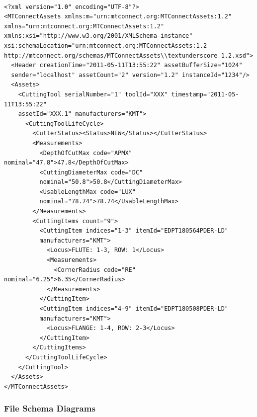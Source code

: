 	\begin{lstlisting}[firstnumber=1,escapechar=|,% 
	caption={Example for Shell Mill with Different Inserts on First Row}, label={lst:Example for Shell Mill with Different Inserts on First Row}]
	
<?xml version="1.0" encoding="UTF-8"?>
<MTConnectAssets xmlns:m="urn:mtconnect.org:MTConnectAssets:1.2" 
xmlns="urn:mtconnect.org:MTConnectAssets:1.2" 
xmlns:xsi="http://www.w3.org/2001/XMLSchema-instance" 
xsi:schemaLocation="urn:mtconnect.org:MTConnectAssets:1.2 
http://mtconnect.org/schemas/MTConnectAssets\\textunderscore 1.2.xsd">
  <Header creationTime="2011-05-11T13:55:22" assetBufferSize="1024" 
  sender="localhost" assetCount="2" version="1.2" instanceId="1234"/>
  <Assets>
    <CuttingTool serialNumber="1" toolId="XXX" timestamp="2011-05-11T13:55:22" 
    assetId="XXX.1" manufacturers="KMT">
      <CuttingToolLifeCycle>
        <CutterStatus><Status>NEW</Status></CutterStatus>
        <Measurements>
          <DepthOfCutMax code="APMX" nominal="47.8">47.8</DepthOfCutMax>
          <CuttingDiameterMax code="DC" 
          nominal="50.8">50.8</CuttingDiameterMax>
          <UsableLengthMax code="LUX" 
          nominal="78.74">78.74</UsableLengthMax>
        </Measurements>
        <CuttingItems count="9">
          <CuttingItem indices="1-3" itemId="EDPT180564PDER-LD" 
          manufacturers="KMT">
            <Locus>FLUTE: 1-3, ROW: 1</Locus>
            <Measurements>
              <CornerRadius code="RE" nominal="6.25">6.35</CornerRadius>
            </Measurements>
          </CuttingItem>
          <CuttingItem indices="4-9" itemId="EDPT180508PDER-LD" 
          manufacturers="KMT">
            <Locus>FLANGE: 1-4, ROW: 2-3</Locus>
          </CuttingItem>
        </CuttingItems>
      </CuttingToolLifeCycle>
    </CuttingTool>
  </Assets>
</MTConnectAssets>

	\end{lstlisting}



\subsubsection{File Schema Diagrams}
\label{sec:File Schema Diagrams}

